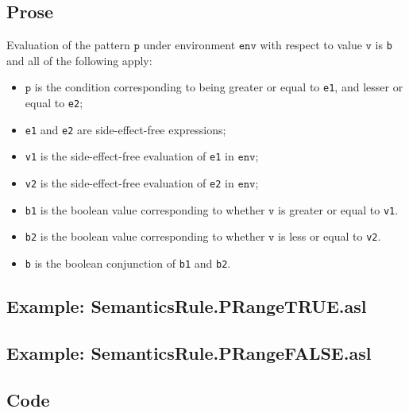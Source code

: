 \documentclass{book}
\newcommand\env[0]{\texttt{env}}
\newcommand\vp[0]{\texttt{p}}
\newcommand\vv[0]{\texttt{v}}
\begin{document}
    \subsection{Prose}
  Evaluation of the pattern $\vp$ under environment $\env$ with
  respect to value $\vv$ is \texttt{b} and all of the following apply:
    \begin{itemize}
      \item $\vp$ is the condition corresponding to being greater or equal
        to \texttt{e1}, and lesser or equal to \texttt{e2};
      \item \texttt{e1} and \texttt{e2} are side-effect-free expressions;
      \item \texttt{v1} is the side-effect-free evaluation of \texttt{e1} in
        $\env$;
      \item \texttt{v2} is the side-effect-free evaluation of \texttt{e2} in
        $\env$;
      \item \texttt{b1} is the boolean value corresponding to whether
        $\vv$ is greater or equal to \texttt{v1}.
      \item \texttt{b2} is the boolean value corresponding to whether
        $\vv$ is less or equal to \texttt{v2}.
      \item \texttt{b} is the boolean conjunction of \texttt{b1} and
        \texttt{b2}.
    \end{itemize}

    \subsection{Example: SemanticsRule.PRangeTRUE.asl}

    \subsection{Example: SemanticsRule.PRangeFALSE.asl}

  \subsection{Code}
\end{document}
